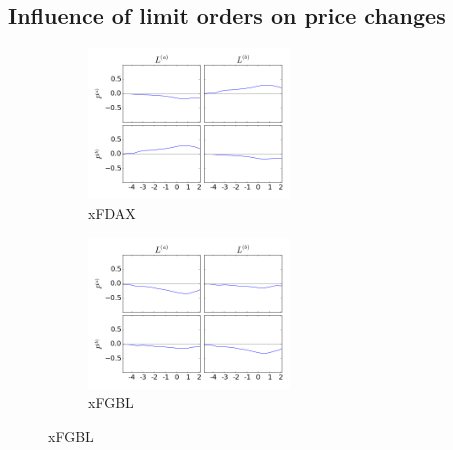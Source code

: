 \documentclass[a4paper,11pt]{article}
\begin{document}
\subsection{Influence of limit orders on price changes}
\label{LP}
\begin{figure}[H]
        \begin{subfigure}[b]{0.45\textwidth}
                \includegraphics[width=\textwidth,height=40mm]{xFDAXPA_PB_TA_TB_LA_LB_CA_CB__LALB-_PAPBcausality.png}
                \caption{xFDAX}
        \end{subfigure}
        \begin{subfigure}[b]{0.45\textwidth}
                \includegraphics[width=\textwidth,height=40mm]{xFGBLPA_PB_TA_TB_LA_LB_CA_CB__LALB-_PAPBcausality.png}
                \caption{xFGBL}
        \end{subfigure}
\end{figure}
\end{document}
